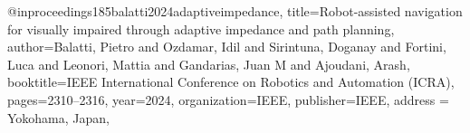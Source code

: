 @inproceedings{185balatti2024adaptiveimpedance,
title={Robot-assisted navigation for visually impaired through adaptive impedance and path planning},
author={Balatti, Pietro and Ozdamar, Idil and Sirintuna, Doganay and Fortini, Luca and Leonori, Mattia and Gandarias, Juan M and Ajoudani, Arash},
booktitle={IEEE International Conference on Robotics and Automation (ICRA)},
pages={2310--2316},
year={2024},
organization={IEEE},
publisher={IEEE},
address = {Yokohama, Japan},
}